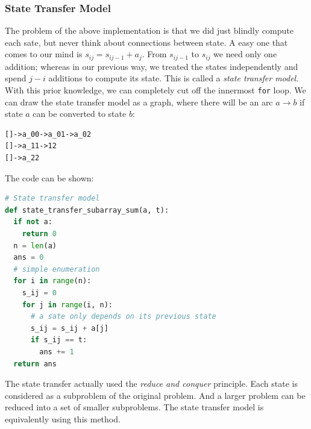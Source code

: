 \documentclass[../main.tex]{subfiles}
\begin{document}
\subsubsection{State Transfer Model} The problem of the above implementation is that we did just blindly compute each sate, but never think about connections between state. A easy one that comes to our mind is $s_{ij}=s_{ij-1}+a_j$. From $s_{ij-1}$ to $s_{ij}$ we need only one addition; whereas in our previous way, we treated the states independently and spend $j-i$ additions to compute its state. This is called a \textit{state transfer model}. With this prior knowledge, we can completely cut off the innermost \texttt{for} loop. We can draw the state transfer model as a graph, where there will be an arc $a\xrightarrow{}b$ if state $a$ can be converted to state $b$:
\begin{lstlisting}[numbers=none]
[]->a_00->a_01->a_02
[]->a_11->12
[]->a_22
\end{lstlisting}
The code can be shown:
\begin{lstlisting}[language=Python]
# State transfer model
def state_transfer_subarray_sum(a, t):
  if not a:
    return 0
  n = len(a)
  ans = 0
  # simple enumeration
  for i in range(n):
    s_ij = 0
    for j in range(i, n):
      # a sate only depends on its previous state
      s_ij = s_ij + a[j] 
      if s_ij == t:
        ans += 1
  return ans 
\end{lstlisting}
The state transfer actually used the \textit{reduce and conquer} principle. Each state is considered as a subproblem of the original problem. And a larger problem can be reduced into a set of smaller subproblems. The state transfer model is equivalently using this method. 
\end{document}
